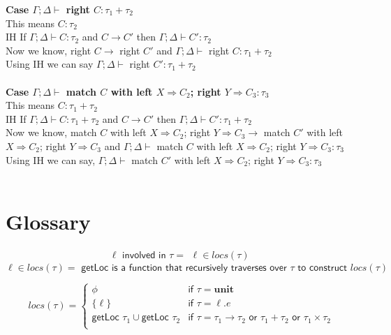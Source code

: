 \documentclass{article}
\begin{document}
\textbf{Case $\Gamma; \Delta \vdash$ right $C : \tau_1+\tau_2$ } \\
This means $C : \tau_2$ \\
IH If $\Gamma; \Delta \vdash C : \tau_2$ and  $C \to C'$ then $\Gamma; \Delta \vdash C' : \tau_2$ \\
Now we know, right $C \to$ right $C'$ and $\Gamma; \Delta \vdash$ right $C : \tau_1+\tau_2$ \\
Using IH we can say $\Gamma;\Delta \vdash$ right $ C' : \tau_1+\tau_2$ \\\\
\textbf{Case $\Gamma;\Delta \vdash$ match $C$ with left $X \Rightarrow C_2 $; right $ Y \Rightarrow C_3 : \tau_3$ } \\
This means $C : \tau_1 + \tau_2$ \\
IH If $\Gamma;\Delta \vdash C : \tau_1+\tau_2$ and  $C \to C'$ then $\Gamma; \Delta \vdash C' : \tau_1+\tau_2$ \\
Now we know, match $C$ with left $X \Rightarrow C_2 $; right $ Y \Rightarrow C_3 \to$
match $C'$ with left $X \Rightarrow C_2 $; right $ Y \Rightarrow C_3$ and $\Gamma; \Delta \vdash$ match $C$ with left $X \Rightarrow C_2 $; right $ Y \Rightarrow C_3 : \tau_3$ \\
Using IH we can say, $\Gamma; \Delta \vdash$ match $C'$ with left $X \Rightarrow C_2 $; right $ Y \Rightarrow C_3 : \tau_3$ \\\\



\section{Glossary}
$$
\ell \textsf{ involved in } \tau = 
    \begin{array}{l}
    \ell \in locs (\tau)
    \end{array}
$$
$$
 \ell \in locs (\tau) = \textsf{ getLoc is a function that recursively traverses over } \tau \textsf{ to construct } locs (\tau)
$$

$$
 locs (\tau) = \left\{
    \begin{array}{ll}
    \phi & \textsf{if } \tau = \textbf{unit}\\
    \{\ell\} & \textsf{if } \tau = \ell.e\\
        \textsf{getLoc } \tau_1 \cup \textsf{getLoc } \tau_2 & \textsf{if } \tau = \tau_1 \to \tau_2 \textsf{ or } \tau_1 + \tau_2 \textsf{ or } \tau_1 \times \tau_2 \\
    \end{array}
\right.
$$
\end{document}
